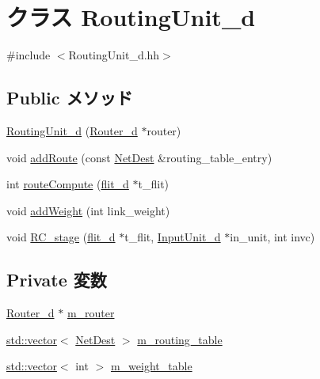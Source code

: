 \hypertarget{classRoutingUnit__d}{
\section{クラス RoutingUnit\_\-d}
\label{classRoutingUnit__d}
}


{\ttfamily \#include $<$RoutingUnit\_\-d.hh$>$}\subsection*{Public メソッド}
\begin{DoxyCompactItemize}
\item 
\hyperlink{classRoutingUnit__d_a57d4fd4ad1e1f1ba24dd307ecbabd5b1}{RoutingUnit\_\-d} (\hyperlink{classRouter__d}{Router\_\-d} $\ast$router)
\item 
void \hyperlink{classRoutingUnit__d_a7f392ab35c8e59678ab340df9910cf01}{addRoute} (const \hyperlink{classNetDest}{NetDest} \&routing\_\-table\_\-entry)
\item 
int \hyperlink{classRoutingUnit__d_ab4ebc8d14fb6a01d9c0e86c021aded35}{routeCompute} (\hyperlink{classflit__d}{flit\_\-d} $\ast$t\_\-flit)
\item 
void \hyperlink{classRoutingUnit__d_a44fd0199b386c22818a7858cef6ae39b}{addWeight} (int link\_\-weight)
\item 
void \hyperlink{classRoutingUnit__d_a536a9cac40c36ea5c44a8bdc4e5db567}{RC\_\-stage} (\hyperlink{classflit__d}{flit\_\-d} $\ast$t\_\-flit, \hyperlink{classInputUnit__d}{InputUnit\_\-d} $\ast$in\_\-unit, int invc)
\end{DoxyCompactItemize}
\subsection*{Private 変数}
\begin{DoxyCompactItemize}
\item 
\hyperlink{classRouter__d}{Router\_\-d} $\ast$ \hyperlink{classRoutingUnit__d_a81d53a65b375007289068e764da769d8}{m\_\-router}
\item 
\hyperlink{classstd_1_1vector}{std::vector}$<$ \hyperlink{classNetDest}{NetDest} $>$ \hyperlink{classRoutingUnit__d_adce3e392ac98699a80750fa4a4aa9b40}{m\_\-routing\_\-table}
\item 
\hyperlink{classstd_1_1vector}{std::vector}$<$ int $>$ \hyperlink{classRoutingUnit__d_aba33ddf03ca5025736337ef48660bd04}{m\_\-weight\_\-table}
\end{DoxyCompactItemize}



